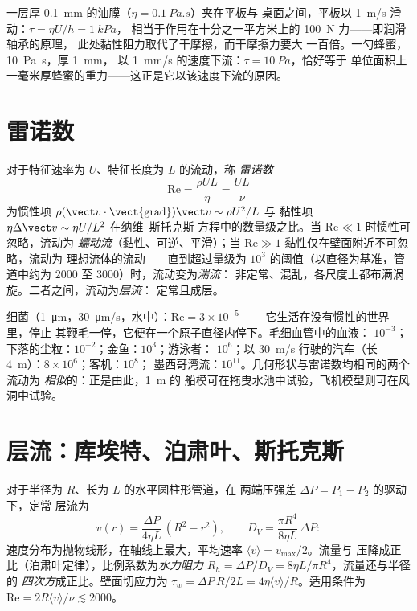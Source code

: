 \begin{example}[桌面上的切应力]\label{ex:b2:viscous-flows:table}
一层厚 \qty{0.1}{mm} 的油膜（$\eta = \qty{0.1}{Pa.s}$）夹在平板与
桌面之间，平板以 \qty{1}{m/s} 滑动：$\tau = \eta U/h = \qty{1}{kPa}$，
相当于作用在十分之一平方米上的 \qty{100}{N} 力——即润滑轴承的原理，
此处黏性阻力取代了干摩擦，而干摩擦力要大
一百倍。一勺蜂蜜，\qty{10}{Pa.s}，厚 \qty{1}{mm}，
以 \qty{1}{mm/s} 的速度下流：$\tau = \qty{10}{Pa}$，恰好等于
单位面积上一毫米厚蜂蜜的重力——这正是它以该速度下流的原因。
\end{example}

\section{雷诺数}

\begin{definition}[雷诺数]\label{def:b2:viscous-flows:reynolds}
对于特征速率为 $U$、特征长度为 $L$ 的流动，称
\emph{雷诺数}
\[
\mathrm{Re} = \frac{\rho UL}{\eta} = \frac{UL}{\nu}
\]
为惯性项
$\rho(\vect v\cdot\operatorname{\vect{grad}})\vect v \sim \rho U^2/L$ 与
黏性项 $\eta\Delta\vect v \sim \eta U/L^2$ 在纳维–斯托克斯
方程中的数量级之比。当 $\mathrm{Re} \ll 1$ 时惯性可忽略，流动为
\emph{蠕动流}（黏性、可逆、平滑）；当 $\mathrm{Re} \gg 1$
黏性仅在壁面附近不可忽略，流动为
理想流体的流动——直到超过量级为 $10^3$ 的阈值（以直径为基准，管道中约为 $2000$
至 $3000$）时，流动变为\emph{湍流}：
非定常、混乱，各尺度上都布满涡旋。二者之间，流动为\emph{层流}：
定常且成层。
\end{definition}

\begin{example}[雷诺数的日常例子]\label{ex:b2:viscous-flows:revalues}
细菌（\qty{1}{\micro m}，\qty{30}{\micro m/s}，水中）：$\mathrm{Re} =
3 \times 10^{-5}$ ——它生活在没有惯性的世界里，停止
其鞭毛一停，它便在一个原子直径内停下。毛细血管中的血液：
$10^{-3}$；下落的尘粒：$10^{-2}$；金鱼：$10^3$；游泳者：
$10^6$；以 \qty{30}{m/s} 行驶的汽车（长 \qty{4}{m}）：$8 \times 10^6$；客机：$10^8$；
墨西哥湾流：$10^{11}$。几何形状与雷诺数均相同的两个流动为
\emph{相似}的：正是由此，\qty{1}{m} 的
船模可在拖曳水池中试验，飞机模型则可在风洞中试验。
\end{example}

\section{层流：库埃特、泊肃叶、斯托克斯}

\begin{proposition}[管道中的泊肃叶流动]\label{prop:b2:viscous-flows:poiseuille}
对于半径为 $R$、长为 $L$ 的水平圆柱形管道，在
两端压强差 $\Delta P = P_1 - P_2$ 的驱动下，定常
层流为
\[
v(r) = \frac{\Delta P}{4\eta L}\,(R^2 - r^2) , \qquad
D_V = \frac{\pi R^4}{8\eta L}\,\Delta P :
\]
速度分布为抛物线形，在轴线上最大，平均速率
$\langle v\rangle = v_{\max}/2$。流量与
压降成正比（泊肃叶定律），比例系数为\emph{水力阻力}
$R_h = \Delta P/D_V = 8\eta L/\pi R^4$，流量还与半径的
\emph{四次方}成正比。壁面切应力为 $\tau_w = \Delta P\,R/2L = 4\eta\langle v
\rangle/R$。适用条件为 $\mathrm{Re} = 2R\langle v\rangle/\nu \lesssim 2000$。
\end{proposition}

